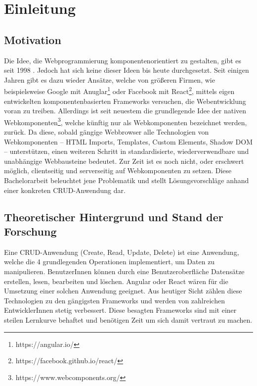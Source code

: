 \chapter{Einleitung}

\section{Motivation}

Die Idee, die Webprogrammierung komponentenorientiert zu gestalten, gibt es seit 1998 \cite{microsoft-webcomponents}. Jedoch hat sich keine dieser Ideen bis heute durchgesetzt.
Seit einigen Jahren gibt es dazu wieder Ansätze, welche von größeren Firmen, wie beispielsweise Google mit Anuglar\footnote{https://angular.io/} oder Facebook mit React\footnote{https://facebook.github.io/react/}, mittels eigen entwickelten komponentenbasierten Frameworks versuchen, die Webentwicklung voran zu treiben. 
Allerdings ist seit neuestem die grundlegende Idee der nativen Webkomponenten\footnote{https://www.webcomponents.org/}, welche künftig nur als Webkomponenten bezeichnet werden, zurück. Da diese, sobald gängige Webbrowser alle Technologien von Webkomponenten -- HTML Imports, Templates, Custom Elements, Shadow DOM -- unterstützen, einen weiteren Schritt in standardisierte, wiederverwendbare und unabhängige Webbausteine bedeutet. Zur Zeit ist es noch nicht, oder erschwert möglich, clientseitig und  serverseitig auf Webkomponenten zu setzen.
Diese Bachelorarbeit beleuchtet jene Problematik und stellt Lösungsvorschläge anhand einer konkreten CRUD-Anwendung dar.


\section{Theoretischer Hintergrund und Stand der Forschung}
\label{sec:hintergrund}

Eine CRUD-Anwendung (Create, Read, Update, Delete) ist eine Anwendung, welche die 4 grundlegenden Operationen implementiert, um Daten zu manipulieren. BenutzerInnen können durch eine Benutzeroberfläche Datensätze erstellen, lesen, bearbeiten und löschen. 
Angular oder React wären für die Umsetzung einer solchen Anwendung geeignet. Aus heutiger Sicht zählen diese Technologien zu den gängigsten Frameworks und werden von zahlreichen EntwicklerInnen stetig verbessert.
Diese besagten Frameworks sind mit einer steilen Lernkurve behaftet und benötigen Zeit um sich damit vertraut zu machen.


